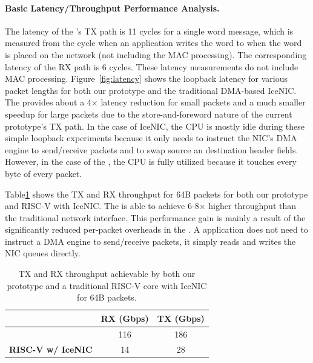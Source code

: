 \paragraph{Basic Latency/Throughput Performance Analysis.} The latency of the \name{}'s TX path is 11 cycles for a single word message, which is measured from the cycle when an application writes the word to when the word is placed on the network (not including the MAC processing).
The corresponding latency of the RX path is 6 cycles.
These latency measurements do not include MAC processing.
Figure~\ref{fig:latency} shows the loopback latency for various packet lengths for both our \name{} prototype and the traditional DMA-based IceNIC.
The \name{} provides about a 4$\times$ latency reduction for small packets and a much smaller speedup for large packets due to the store-and-foreword nature of the current \name{} prototype's TX path.
In the case of IceNIC, the CPU is mostly idle during these simple loopback experiments because it only needs to instruct the NIC's DMA engine to send/receive packets and to swap source an destination header fields.
However, in the case of the \name{}, the CPU is fully utilized because it touches every byte of every packet.

Table\ref{tab:throughput} shows the TX and RX throughput for 64B packets for both our \name{} prototype and RISC-V with IceNIC.
The \name{} is able to achieve 6-8$\times$ higher throughput than the traditional network interface.
This performance gain is mainly a result of the significantly reduced per-packet overheads in the \name{}.
A \name{} application does not need to instruct a DMA engine to send/receive packets, it simply reads and writes the NIC queues directly.

\begin{table}
\begin{center}
\begin{tabular}{|c|c|c|}
\hline
                          & \textbf{RX (Gbps)} & \textbf{TX (Gbps)} \\ \hline
\textbf{\name{}}          & 116                & 186                           \\ \hline
\textbf{RISC-V w/ IceNIC} & 14                 & 28                            \\ \hline
\end{tabular}
\caption{TX and RX throughput achievable by both our \name{} prototype and a traditional RISC-V core with IceNIC for 64B packets.}
\label{tab:throughput}
\end{center}
\end{table}

